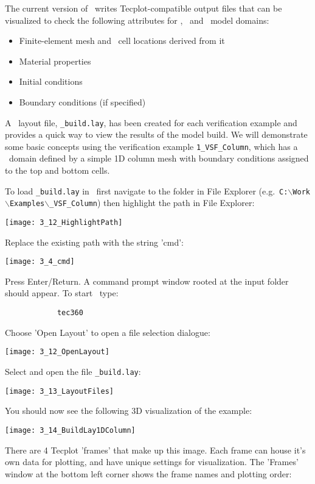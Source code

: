 The current version of \mut\ writes Tecplot-compatible output files that can be visualized to check the following attributes for \gwf, \swf\ and \cln\ model domains:
\begin{itemize}
  \item Finite-element mesh and \mfus\ cell locations derived from it
  \item Material properties
  \item Initial conditions
  \item Boundary conditions (if specified)
\end{itemize}

A \tecplot\ layout file, \texttt{\_build.lay}, has been created for each verification example and  provides a quick way to view the results of the model build.
We will demonstrate some basic concepts using the verification example \texttt{1\_VSF\_Column}, which has a \gwf\ domain defined by a simple 1D column mesh with boundary conditions assigned to the  top and bottom cells.

To load \texttt{\_build.lay} in \tecplot\ first navigate to the folder in File Explorer (e.g.\ \texttt{C:$\backslash$Work$\backslash$Examples$\backslash$\_VSF\_Column}) then highlight the path in File Explorer:

        \texttt{[image: 3\_12\_HighlightPath]}

Replace the existing path with the string 'cmd':

        \texttt{[image: 3\_4\_cmd]}

Press Enter/Return. A command prompt window rooted at the input folder should appear. To start \tecplot\, type:
        \begin{verbatim}
            tec360
        \end{verbatim}

Choose 'Open Layout' to open a file selection dialogue:

        \texttt{[image: 3\_12\_OpenLayout]}

Select and open the file \texttt{\_build.lay}:

        \texttt{[image: 3\_13\_LayoutFiles]}

You should now see the following 3D visualization of the example:

        \texttt{[image: 3\_14\_BuildLay1DColumn]}

There are 4 Tecplot 'frames' that make up this image.  Each frame can house it's own data for plotting, and have unique settings for visualization.  The 'Frames' window at the bottom left corner shows the frame names and plotting order:

